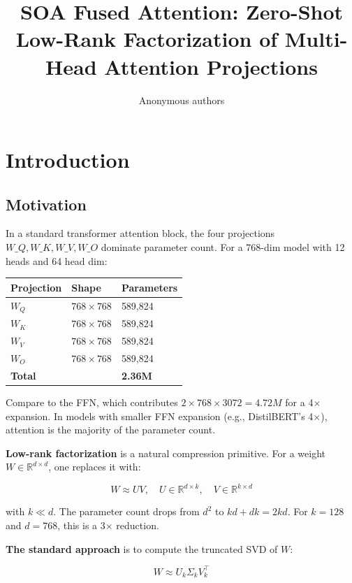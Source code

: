 \title{\textbf{SOA Fused Attention: Zero-Shot Low-Rank Factorization of Multi-Head Attention Projections}}

\author{Anonymous authors}


\section{Introduction}

\subsection{Motivation}

In a standard transformer attention block, the four projections $W\_Q, W\_K, 
W\_V, W\_O$ dominate parameter count. For a 768-dim model with 12 heads and 
64 head dim:

\begin{table}[H]
\centering
\small
\begin{tabular}{lll}
\toprule
\textbf{Projection} & \textbf{Shape} & \textbf{Parameters} \\
\midrule
$W_Q$ & $768 \times 768$ & 589,824 \\
$W_K$ & $768 \times 768$ & 589,824 \\
$W_V$ & $768 \times 768$ & 589,824 \\
$W_O$ & $768 \times 768$ & 589,824 \\
\textbf{Total} &  & \textbf{2.36M} \\
\bottomrule
\end{tabular}
\end{table}

Compare to the FFN, which contributes $2 \times 768 \times 3072 = 4.72M$ for 
a 4$\times$ expansion. In models with smaller FFN expansion (e.g., DistilBERT's 4$\times$), 
attention is the majority of the parameter count.

\textbf{Low-rank factorization} is a natural compression primitive. For a weight 
$W \in \mathbb{R}^{d \times d}$, one replaces it with:

\[
W \approx U V, \quad U \in \mathbb{R}^{d \times k}, \quad V \in \mathbb{R}^{k \times d}
\]

with $k \ll d$. The parameter count drops from $d^2$ to $kd + dk = 2kd$. For 
$k = 128$ and $d = 768$, this is a 3$\times$ reduction.

\textbf{The standard approach} is to compute the truncated SVD of $W$:

\[
W \approx U_k \Sigma_k V_k^\top
\]

